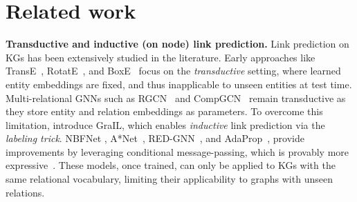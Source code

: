 \section{Related work}
\textbf{Transductive and inductive (on node) link prediction.} Link prediction on KGs has been extensively studied in the literature. Early approaches like TransE~\citep{brodes2013transe}, RotatE~\citep{sun2019rotate}, and BoxE~\citep{abbound2020boxe} focus on the \emph{transductive} setting, 
where learned entity 
embeddings are fixed, and thus 
inapplicable to unseen 
entities at test time. 
Multi-relational GNNs such as RGCN~\citep{schlichtkrull2017modeling} and CompGCN~\citep{vashishth2020compositionbased} remain transductive as they store entity and relation embeddings as parameters. To overcome this limitation, \citet{grail2020teru} introduce GraIL, which enables 
\emph{inductive} link prediction via the {\em labeling trick}. 
NBFNet \citep{zhu2022neural}, %
A*Net~\citep{zhu2023anet}, RED-GNN~\citep{zhang2022redgnn}, and AdaProp~\citep{adaprop}, 
provide improvements 
by leveraging conditional message-passing, which is provably more expressive~\citep{huang2023theory}.
These models, once trained, can only be applied to KGs with the same relational vocabulary, limiting their applicability
to graphs with unseen relations. %

